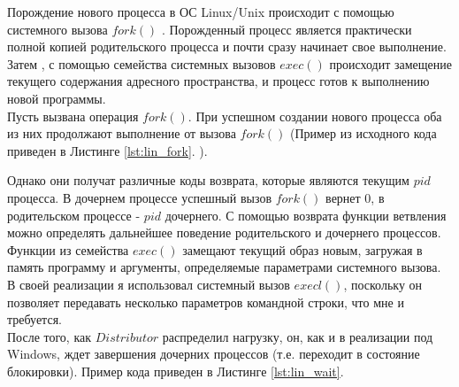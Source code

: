 Порождение нового процесса в ОС Linux/Unix происходит с помощью системного вызова $fork()$ \cite{lav}. Порожденный процесс является практически полной копией родительского процесса и почти сразу начинает свое выполнение. Затем , с помощью семейства системных вызовов $exec()$ \cite{lav} происходит замещение текущего содержания адресного пространства, и процесс готов к выполнению новой программы.\\
Пусть вызвана операция $fork()$. При успешном создании нового процесса оба из них продолжают выполнение от вызова $fork()$ (Пример из исходного кода приведен в Листинге \ref{lst:lin_fork}. ).


Однако они получат различные коды возврата, которые являются текущим $pid$ процесса. В дочернем процессе успешный вызов $fork()$ вернет $0$, в родительском процессе - $pid$ дочернего. С помощью возврата функции ветвления можно определять дальнейшее поведение родительского и дочернего процессов.\\
Функции из семейства $exec()$ замещают текущий образ новым, загружая в память программу и аргументы, определяемые параметрами системного вызова. В своей реализации я использовал системный вызов $execl()$, поскольку он позволяет передавать несколько параметров командной строки, что мне и требуется.\\
После того, как $Distributor$ распределил нагрузку, он, как и в реализации под Windows, ждет завершения дочерних процессов (т.е. переходит в состояние блокировки). Пример кода приведен в Листинге \ref{lst:lin_wait}.


